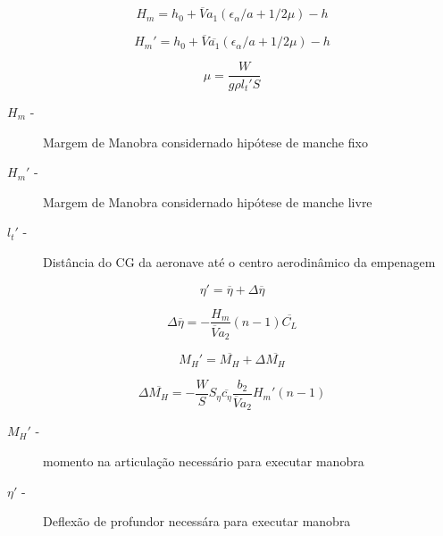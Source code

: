 \begin{equation}
\label{margemmanobra1}
H_m = h_0 + \overline{V} a_1 (\epsilon_{\alpha}/a + 1/2 \mu) - h
\end{equation}

\begin{equation}
\label{margemmanobra2}
H_m' = h_0 + \overline{V} \overline{a_1} (\epsilon_{\alpha}/a + 1/2 \mu) - h
\end{equation}

\begin{equation}
\label{margemmanobra3}
\mu = \frac{W}{g \rho l_t' S}
\end{equation}

\begin{description}
\item[$H_m$ -] Margem de Manobra considernado hipótese de manche fixo
\item[$H_m'$ -] Margem de Manobra considernado hipótese de manche livre
\item[$l_t'$ -] Distância do CG da aeronave até o centro aerodinâmico da empenagem
\end{description}

\begin{equation}
\label{vooNz_1}
\eta' = \overline{\eta} + \Delta\overline{\eta}
\end{equation}

\begin{equation}
\label{vooNz_2}
\Delta\overline{\eta} = - \frac{H_m}{\overline{V} a_2} (n - 1) \overline{C_L}
\end{equation}

\begin{equation}
\label{vooNz_3}
M_H' = \overline{M_H} + \Delta\overline{M_H}
\end{equation}

\begin{equation}
\label{vooNz_4}
\Delta\overline{M_H} = - \frac{W}{S} S_{\eta} \overline{c_{\eta}} \frac{b_2}{\overline{V} a_2} H_m' (n-1)
\end{equation}

\begin{description}
\item[$M_H'$ -] momento na articulação necessário para executar manobra
\item[$\eta'$ -] Deflexão de profundor necessára para executar manobra
\end{description}

